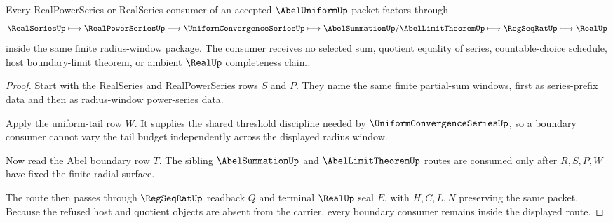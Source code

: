 \begin{theorem}
\label{thm:abel-uniform-boundary-consumer-route}
Every RealPowerSeries or RealSeries consumer of an accepted $\AbelUniformUp$ packet factors through
$$
\RealSeriesUp \longmapsto \RealPowerSeriesUp \longmapsto \UniformConvergenceSeriesUp \longmapsto \AbelSummationUp/\AbelLimitTheoremUp \longmapsto \RegSeqRatUp \longmapsto \RealUp
$$
inside the same finite radius-window package. The consumer receives no selected sum, quotient equality of series, countable-choice schedule, host boundary-limit theorem, or ambient $\RealUp$ completeness claim.
\end{theorem}
\begin{proof}
Start with the RealSeries and RealPowerSeries rows $S$ and $P$. They name the same finite partial-sum windows, first as series-prefix data and then as radius-window power-series data.

Apply the uniform-tail row $W$. It supplies the shared threshold discipline needed by $\UniformConvergenceSeriesUp$, so a boundary consumer cannot vary the tail budget independently across the displayed radius window.

Now read the Abel boundary row $T$. The sibling $\AbelSummationUp$ and $\AbelLimitTheoremUp$ routes are consumed only after $R,S,P,W$ have fixed the finite radial surface.

The route then passes through $\RegSeqRatUp$ readback $Q$ and terminal $\RealUp$ seal $E$, with $H,C,L,N$ preserving the same packet. Because the refused host and quotient objects are absent from the carrier, every boundary consumer remains inside the displayed route.
\end{proof}



